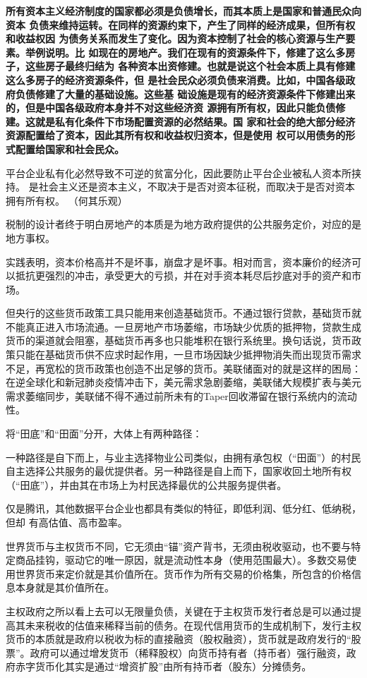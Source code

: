 \textbf{所有资本主义经济制度的国家都必须是负债增长，而其本质上是国家和普通民众向资本
负债来维持运转。在同样的资源约束下，产生了同样的经济成果，但所有权和收益权因
为债务关系而发生了变化。因为资本控制了社会的核心资源与生产要素。举例说明。比
如现在的房地产。我们在现有的资源条件下，修建了这么多房子，这些房子最终归结为
各种资本出资修建。也就是说这个社会本质上具有修建这么多房子的经济资源条件，但
是社会民众必须负债来消费。比如，中国各级政府负债修建了大量的基础设施。这些基
础设施是现有的经济资源条件下修建出来的，但是中国各级政府本身并不对这些经济资
源拥有所有权，因此只能负债修建。这就是私有化条件下市场配置资源的必然结果。国
家和社会的绝大部分经济资源配置给了资本，因此其所有权和收益权归资本，但是使用
权可以用债务的形式配置给国家和社会民众。}

平台企业私有化必然导致不可逆的贫富分化，因此要防止平台企业被私人资本所挟持。
是社会主义还是资本主义，不取决于是否对资本征税，而取决于是否对资本拥有所有权。
（何其乐观）

税制的设计者终于明白房地产的本质是为地方政府提供的公共服务定价，对应的是地方事权。

实践表明，资本价格高并不是坏事，崩盘才是坏事。相对而言，资本廉价的经济可以抵抗更强烈的冲击，承受更大的亏损，并在对手资本耗尽后抄底对手的资产和市场。

但央行的这些货币政策工具只能用来创造基础货币。不通过银行贷款，基础货币就不能真正进入市场流通。一旦房地产市场萎缩，市场缺少优质的抵押物，贷款生成货币的渠道就会阻塞，基础货币再多也只能堆积在银行系统里。换句话说，货币政策只能在基础货币供不应求时起作用，一旦市场因缺少抵押物消失而出现货币需求不足，再宽松的货币政策也创造不出足够的货币。美联储面对的就是这样的困局：在逆全球化和新冠肺炎疫情冲击下，美元需求急剧萎缩，美联储大规模扩表与美元需求萎缩同步，美联储不得不通过前所未有的Taper回收滞留在银行系统内的流动性。

将“田底”和“田面”分开，大体上有两种路径：

一种路径是自下而上，与业主选择物业公司类似，由拥有承包权（“田面”）的村民自主选择公共服务的最优提供者。另一种路径是自上而下，国家收回土地所有权（“田底”），并由其在市场上为村民选择最优的公共服务提供者。

仅是腾讯，其他数据平台企业也都具有类似的特征，即低利润、低分红、低纳税，但却
有高估值、高市盈率。

世界货币与主权货币不同，它无须由“锚”资产背书，无须由税收驱动，也不要与特定商品挂钩，驱动它的唯一原因，就是流动性本身（使用范围最大）。多数交易使用世界货币来定价就是其价值所在。货币作为所有交易的价格集，所包含的价格信息本身就是其价值所在。

主权政府之所以看上去可以无限量负债，关键在于主权货币发行者总是可以通过提高其未来税收的估值来稀释当前的债务。在现代信用货币的生成机制下，发行主权货币的本质就是政府以税收为标的直接融资（股权融资），货币就是政府发行的“股票”。政府可以通过增发货币（稀释股权）向货币持有者（持币者）强行融资，政府赤字货币化其实是通过“增资扩股”由所有持币者（股东）分摊债务。





